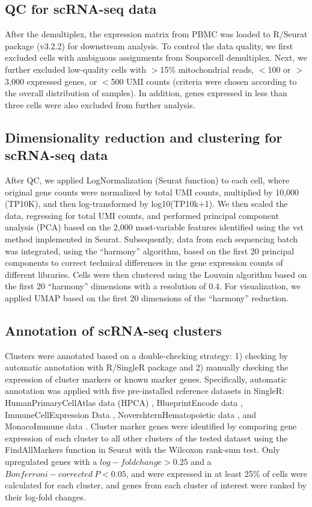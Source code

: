 \documentclass{book}
\begin{document}
\begin{refsection}
\subsection*{QC for scRNA-seq data}
After the demultiplex, the expression matrix from PBMC was loaded to R/Seurat package (v3.2.2) \cite{Stuart2019Comprehensive} for downstream analysis.
To control the data quality, we first excluded cells with ambiguous assignments from Souporcell demultiplex.
Next, we further excluded low-quality cells with $>$15\% mitochondrial reads, $<$100 or $>$3,000 expressed genes, or $<$500 UMI counts (criteria were chosen according to the overall distribution of samples).
In addition, genes expressed in less than three cells were also excluded from further analysis.

\subsection*{Dimensionality reduction and clustering for scRNA-seq data}
After QC, we applied LogNormalization (Seurat function) to each cell, where original gene counts were normalized by total UMI counts, multiplied by 10,000 (TP10K), and then log-transformed by log10(TP10k+1).
We then scaled the data, regressing for total UMI counts, and performed principal component analysis (PCA) based on the 2,000 most-variable features identified using the vst method implemented in Seurat.
Subsequently, data from each sequencing batch was integrated, using the \enquote{harmony} algorithm, based on the first 20 principal components to correct technical differences in the gene expression counts of different libraries.
Cells were then clustered using the Louvain algorithm based on the first 20 \enquote{harmony} dimensions with a resolution of 0.4.
For visualization, we applied UMAP based on the first 20 dimensions of the \enquote{harmony} reduction.

\subsection*{Annotation of scRNA-seq clusters}
Clusters were annotated based on a double-checking strategy: 1) checking by automatic annotation with R/SingleR package \cite{Aran2019Reference} and 2) manually checking the expression of cluster markers or known marker genes.
Specifically, automatic annotation was applied with five pre-installed reference datasets in SingleR: HumanPrimaryCellAtlas data (HPCA) \cite{Mabbott2013An}, BlueprintEncode data \cite{Martens2013BLUEPRINT,Epigenomics2012An}, ImmuneCellExpression Data \cite{Schmiedel2018Impact}, NovershternHematopoietic data \cite{Novershtern2011Densely}, and MonacoImmune data \cite{Monaco2019RNA}.
Cluster marker genes were identified by comparing gene expression of each cluster to all other clusters of the tested dataset using the FindAllMarkers function in Seurat with the Wilcoxon rank-sum test.
Only upregulated genes with a $log-fold change > 0.25$ and a $Bonferroni-corrected~P < 0.05$, and were expressed in at least 25\% of cells were calculated for each cluster, and genes from each cluster of interest were ranked by their log-fold changes.


\end{refsection}
\end{document}

